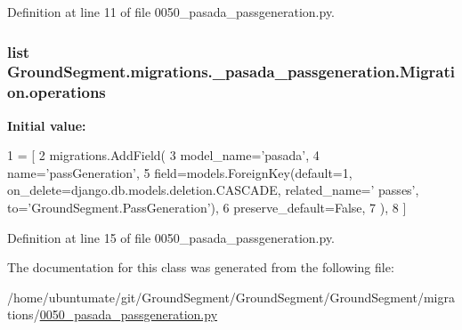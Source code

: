 Definition at line 11 of file 0050\+\_\+pasada\+\_\+passgeneration.\+py.

\hypertarget{class_ground_segment_1_1migrations_1_10050__pasada__passgeneration_1_1_migration_a431260fad3aa000779e1cdbc21cd4130}{}
\subsubsection[{operations}]{\setlength{\rightskip}{0pt plus 5cm}list Ground\+Segment.\+migrations.\+\_\+pasada\+\_\+passgeneration.\+Migration.\+operations\hspace{0.3cm}{\ttfamily [static]}}\label{class_ground_segment_1_1migrations_1_10050__pasada__passgeneration_1_1_migration_a431260fad3aa000779e1cdbc21cd4130}
{\bfseries Initial value\+:}
\begin{DoxyCode}
1 = [
2         migrations.AddField(
3             model\_name=\textcolor{stringliteral}{'pasada'},
4             name=\textcolor{stringliteral}{'passGeneration'},
5             field=models.ForeignKey(default=1, on\_delete=django.db.models.deletion.CASCADE, related\_name=\textcolor{stringliteral}{'
      passes'}, to=\textcolor{stringliteral}{'GroundSegment.PassGeneration'}),
6             preserve\_default=\textcolor{keyword}{False},
7         ),
8     ]
\end{DoxyCode}


Definition at line 15 of file 0050\+\_\+pasada\+\_\+passgeneration.\+py.



The documentation for this class was generated from the following file\+:\begin{DoxyCompactItemize}
\item 
/home/ubuntumate/git/\+Ground\+Segment/\+Ground\+Segment/\+Ground\+Segment/migrations/\hyperlink{0050__pasada__passgeneration_8py}{0050\+\_\+pasada\+\_\+passgeneration.\+py}\end{DoxyCompactItemize}
